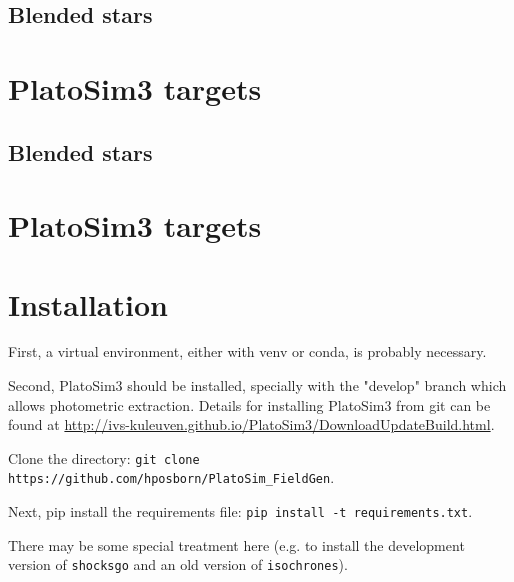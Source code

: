 \documentclass{article}
\begin{document}
\subsection{Blended stars}

\section{PlatoSim3 targets}


\subsection{Blended stars}

\section{PlatoSim3 targets}

\section{Installation}
First, a virtual environment, either with venv or conda, is probably necessary.

Second, PlatoSim3 should be installed, specially with the "develop" branch which allows photometric extraction. Details for installing PlatoSim3 from git can be found at \url{http://ivs-kuleuven.github.io/PlatoSim3/DownloadUpdateBuild.html}.

Clone the directory: \texttt{git clone https://github.com/hposborn/PlatoSim\_FieldGen}.

Next, pip install the requirements file: \texttt{pip install -t requirements.txt}.

There may be some special treatment here (e.g. to install the development version of \texttt{shocksgo} and an old version of \texttt{isochrones}).



\end{document}

